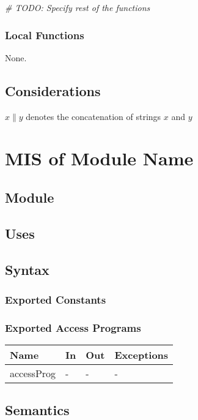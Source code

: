 \documentclass[12pt, titlepage]{article}
\begin{document}
\medskip
\emph{\# TODO: Specify rest of the functions}

\subsubsection{Local Functions}
None.

\subsection{Considerations}
$x \| y$ denotes the concatenation of strings $x$ and $y$

\pagebreak
\section{MIS of Module Name} \label{Module} 

\subsection{Module}

\subsection{Uses}

\subsection{Syntax}

\subsubsection{Exported Constants}

\subsubsection{Exported Access Programs}

\begin{center}
\begin{tabular}{p{2cm} p{4cm} p{4cm} p{2cm}}
\hline
\textbf{Name} & \textbf{In} & \textbf{Out} & \textbf{Exceptions} \\
\hline
accessProg & - & - & - \\
\hline
\end{tabular}
\end{center}

\subsection{Semantics}
\end{document}
